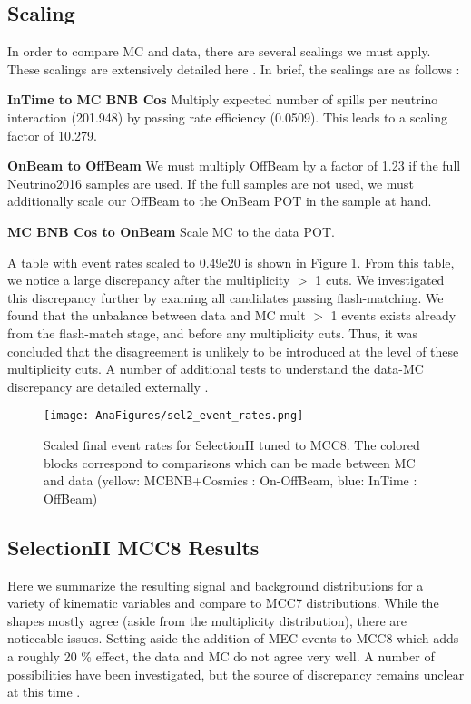 \documentclass[12pt]{article}
\begin{document}
\clearpage

\subsection{Scaling}
In order to compare MC and data, there are several scalings we must apply.  These scalings are extensively detailed here \cite{bib:normdatamc}. In brief, the scalings are as follows :
\par \textbf{InTime to MC BNB Cos} Multiply expected number of spills per neutrino interaction (201.948) by passing rate efficiency (0.0509). This leads to a scaling factor of 10.279.

\par \textbf{OnBeam to OffBeam} We must multiply OffBeam by a factor of 1.23 if the full Neutrino2016 samples are used. If the full samples are not used, we must additionally scale our OffBeam to the OnBeam POT in the sample at hand.

\par \textbf{MC BNB Cos to OnBeam} Scale MC to the data POT.


\noindent A table with event rates scaled to 0.49e20 is shown in Figure \ref{fig:sel2_event_rates}.  From this table, we notice a large discrepancy after the multiplicity $>$ 1 cuts. We investigated this discrepancy further by examing all candidates passing flash-matching.  We found that the unbalance between data and MC mult $>$ 1 events exists already from the flash-match stage, and before any multiplicity cuts. Thus, it was concluded that the disagreement is unlikely to be introduced at the level of these multiplicity cuts. A number of additional tests to understand the data-MC discrepancy are detailed externally \cite{bib:datamc}.
\begin{figure}[h!]
\centering
\texttt{[image: AnaFigures/sel2\_event\_rates.png]}
\caption{Scaled final event rates for SelectionII tuned to MCC8. The colored blocks correspond to comparisons which can be made between MC and data (yellow: MCBNB+Cosmics : On-OffBeam, blue: InTime : OffBeam) }
\label{fig:sel2_event_rates}
\end{figure}

\subsection{SelectionII MCC8 Results}
Here we summarize the resulting signal and background distributions for a variety of kinematic variables and compare to MCC7 distributions. While the shapes mostly agree (aside from the multiplicity distribution), there are noticeable issues. Setting aside the addition of MEC events to MCC8 which adds a roughly 20 \% effect, the data and MC do not agree very well. A number of possibilities have been investigated, but the source of discrepancy remains unclear at this time \cite{bib:datamc}. 
\end{document}
